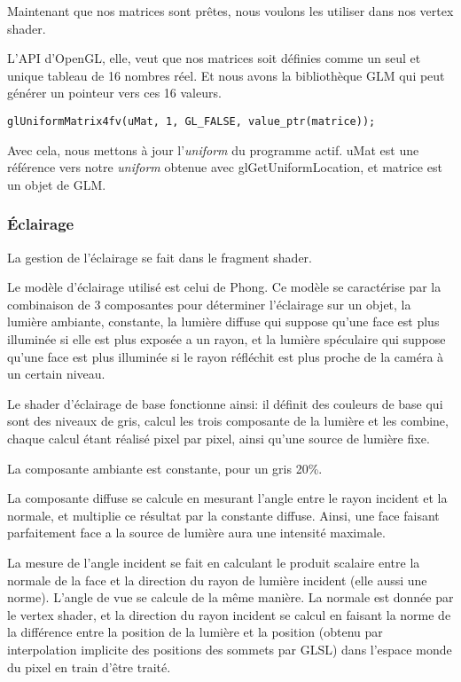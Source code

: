 \documentclass[pdftex, 11pt, a4paper, titlepage]{article}
\begin{document}
Maintenant que nos matrices sont prêtes, nous voulons les utiliser
dans nos vertex shader.

L'API d'OpenGL, elle, veut que nos matrices soit définies comme
un seul et unique tableau de 16 nombres réel. Et nous avons la
bibliothèque GLM qui peut générer un pointeur vers ces 16 valeurs.

\begin{lstlisting}
glUniformMatrix4fv(uMat, 1, GL_FALSE, value_ptr(matrice));
\end{lstlisting}

Avec cela, nous mettons à jour l'\emph{uniform} du programme actif.
uMat est une référence vers notre \emph{uniform} obtenue avec glGetUniformLocation,
et matrice est un objet de GLM.

\subsubsection{Éclairage}

La gestion de l'éclairage se fait dans le fragment shader.

Le modèle d'éclairage utilisé est celui de Phong. Ce modèle se caractérise par
la combinaison de 3 composantes pour déterminer l'éclairage sur un objet,
la lumière ambiante, constante, la lumière diffuse qui suppose qu'une face
est plus illuminée si elle est plus exposée a un rayon, et la lumière 
spéculaire qui suppose qu'une face est plus illuminée si le rayon réfléchit
 est plus proche de la caméra à un certain niveau.

Le shader d'éclairage de base fonctionne ainsi: il définit des couleurs de
 base qui sont des niveaux de gris, calcul les trois composante de la lumière
 et les combine, chaque calcul étant réalisé pixel par pixel, 
ainsi qu'une source de lumière fixe.

La composante ambiante est constante, pour un gris 20\%.

La composante diffuse se calcule en mesurant l'angle entre le rayon incident
 et la normale, et multiplie ce résultat par la constante diffuse. 
Ainsi, une face faisant parfaitement face a la source de lumière aura
 une intensité maximale.

La mesure de l'angle incident se fait en calculant le produit scalaire 
entre la normale de la face et la direction du rayon de lumière incident
(elle aussi une norme). L'angle de vue se calcule de la même manière.
La normale est donnée par le vertex shader, et la direction du rayon incident
 se calcul en faisant la norme de la différence entre la position de la
 lumière et la position (obtenu par interpolation implicite des positions des
 sommets par GLSL) dans l'espace monde du pixel en train d'être traité.
\end{document}
